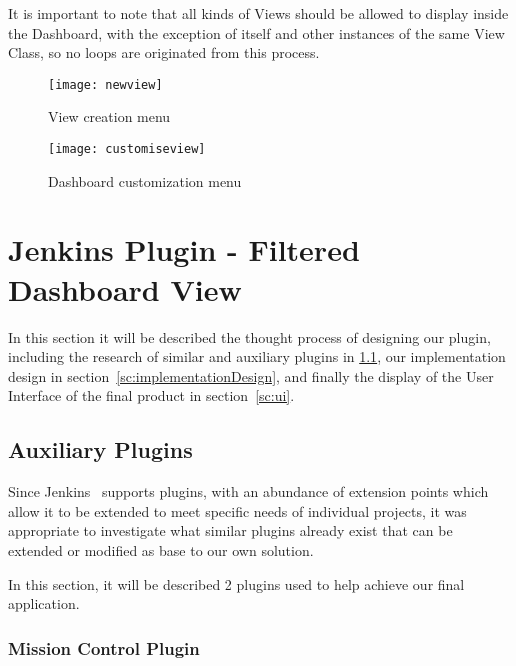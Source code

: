 It is important to note that all kinds of Views should be allowed to display inside the Dashboard, with the exception of itself and other instances of the same View Class, so no loops are originated from this process. 


    \begin{figure}[H]
        \begin{minipage}[b]{0.45\linewidth}
            \centering
            \texttt{[image: newview]}
            \caption{View creation menu}
            \label{fig:createView}
        \end{minipage}
        \hspace{0.5cm}
        \begin{minipage}[b]{0.45\linewidth}
            \centering
            \texttt{[image: customiseview]}
            \caption{Dashboard customization menu}
            \label{fig:customize}
        \end{minipage}
    \end{figure}

\section{Jenkins Plugin - Filtered Dashboard View}\label{sc:dashboard}

In this section it will be described the thought process of designing our plugin, including the research of similar and auxiliary plugins in \ref{sc:aux}, our implementation design in section~\ref{sc:implementationDesign}, and finally the display of the User Interface of the final product in section~\ref{sc:ui}.


\subsection{Auxiliary Plugins}\label{sc:aux}

Since Jenkins~\citet{kn:Jenkins} supports plugins, with an abundance of extension points which allow it to be extended to meet specific needs of individual projects, it was appropriate to investigate what similar plugins already exist that can be extended or modified as base to our own solution.

In this section, it will be described 2 plugins used to help achieve our final application.

\subsubsection{Mission Control Plugin}\label{mission_plugin}

